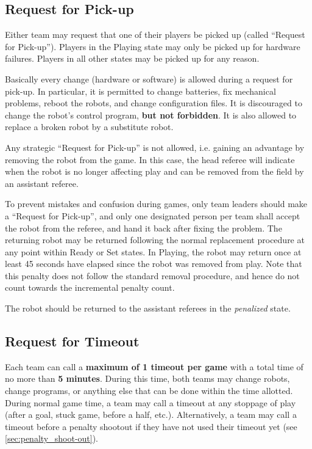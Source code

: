 \documentclass[12pt]{article}
\begin{document}
\subsection{Request for Pick-up}
\label{sec:request_for_pickup}

Either team may request that one of their players be picked up (called ``Request for Pick-up'').  Players in the Playing state may only be picked up for hardware failures.  Players in all other states may be picked up for any reason.

Basically every change (hardware or software) is allowed during a request for pick-up. In particular,
it is permitted to change batteries, fix mechanical problems, reboot the robots, and change configuration files.
It is discouraged to change the robot's control program, \textbf{but not forbidden}.
It is also allowed to replace a broken robot by a substitute robot.

Any strategic ``Request for Pick-up'' is not allowed, i.e. gaining an advantage by removing the robot from the game.
In this case, the head referee will indicate when the robot is no longer affecting play and can be removed from the field by an assistant referee.

To prevent mistakes and confusion during games, only team leaders should make a ``Request for Pick-up'', and only one designated person per team shall accept the robot from the referee, and hand it back after fixing the problem.
The returning robot may be returned following the normal replacement procedure at any point within Ready or Set states.  In Playing, the robot may return once at least 45 seconds have elapsed since the robot was removed from play. Note that this penalty does not follow the standard removal procedure, and hence do not count towards the incremental penalty count.

The robot should be returned to the assistant referees in the \emph{penalized} state.

\subsection{Request for Timeout}
\label{sec:request_for_timeout}

Each team can call a \textbf{maximum of 1 timeout per game} with a total time of no more than \textbf{5 minutes}. During this time, both teams may change robots, change programs, or anything else that can be done within the time allotted.  During normal game time, a team may call a timeout at any stoppage of play (after a goal, stuck game, before a half, etc.). Alternatively, a team may call a timeout before a penalty shootout if they have not used their timeout yet (see \ref{sec:penalty_shoot-out}).
\end{document}
